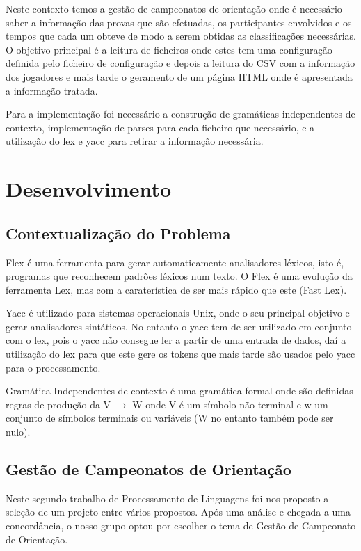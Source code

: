 \documentclass[11pt, a4paper, oneside]{article}
\begin{document}
Neste contexto temos a gestão de campeonatos de orientação onde é necessário saber a informação das provas que são efetuadas, os participantes envolvidos e os tempos que cada um obteve de modo a serem obtidas as classificações necessárias.
O objetivo principal é a leitura de ficheiros onde estes tem uma configuração definida pelo ficheiro de configuração e depois a leitura do CSV com a informação dos jogadores e mais tarde o geramento de um página HTML onde é apresentada a informação tratada.

Para a implementação foi necessário a construção de gramáticas independentes de contexto, implementação de parses para cada ficheiro que necessário, e a utilização do lex e yacc para retirar a informação necessária.


\newpage
\section{Desenvolvimento}

\subsection{Contextualização do Problema}

Flex é uma ferramenta para gerar automaticamente analisadores léxicos, isto é, programas que reconhecem padrões léxicos num texto. O Flex é uma evolução da ferramenta Lex, mas com a caraterística de ser mais rápido que este (Fast Lex).

Yacc é utilizado para sistemas operacionais Unix, onde o seu principal objetivo e gerar analisadores sintáticos. No entanto o yacc tem de ser utilizado em conjunto com o lex, pois o yacc não consegue ler a partir de uma entrada de dados, daí a utilização  do lex para que este gere os tokens que mais tarde são usados pelo yacc para o processamento.

Gramática Independentes de contexto é uma gramática formal onde são definidas regras de produção da 
 V $\rightarrow$ W onde V é um símbolo não terminal e w um conjunto de símbolos terminais ou variáveis (W no entanto também pode ser nulo).

\subsection{Gestão de Campeonatos de Orientação }

Neste segundo trabalho de Processamento de Linguagens foi-nos proposto a seleção de um projeto entre vários propostos. Após uma análise e chegada a uma concordância, o nosso grupo optou por escolher o tema de Gestão de Campeonato de Orientação.
\end{document}
